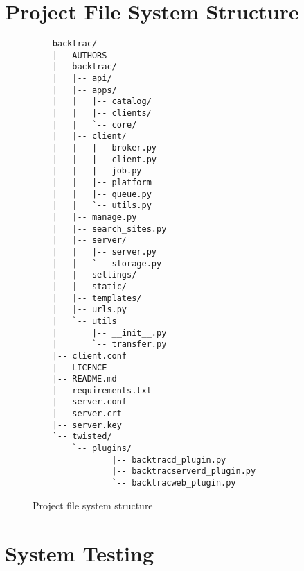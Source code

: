 \section{Project File System Structure}

\begin{figure}
    \begin{center}
        \begin{verbatim}
    backtrac/
    |-- AUTHORS
    |-- backtrac/
    |   |-- api/
    |   |-- apps/
    |   |   |-- catalog/
    |   |   |-- clients/
    |   |   `-- core/
    |   |-- client/
    |   |   |-- broker.py
    |   |   |-- client.py
    |   |   |-- job.py
    |   |   |-- platform
    |   |   |-- queue.py
    |   |   `-- utils.py
    |   |-- manage.py
    |   |-- search_sites.py
    |   |-- server/
    |   |   |-- server.py
    |   |   `-- storage.py
    |   |-- settings/
    |   |-- static/
    |   |-- templates/
    |   |-- urls.py
    |   `-- utils
    |       |-- __init__.py
    |       `-- transfer.py
    |-- client.conf
    |-- LICENCE
    |-- README.md
    |-- requirements.txt
    |-- server.conf
    |-- server.crt
    |-- server.key
    `-- twisted/
        `-- plugins/
                |-- backtracd_plugin.py
                |-- backtracserverd_plugin.py
                `-- backtracweb_plugin.py
        \end{verbatim}
    \end{center}
    \caption{Project file system structure}
    \label{fig:detailed-file-structure}
\end{figure}

\section{System Testing}
\label{sec:appendix-system-testing}

